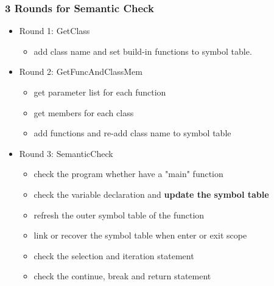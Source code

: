 \documentclass{beamer}
\begin{document}
\begin{frame} \frametitle{3 Rounds for Semantic Check}
	\begin{itemize}
		\item Round 1: GetClass
			\begin{itemize}
				\item add class name and set build-in functions to symbol table.	
			\end{itemize}
		\item Round 2: GetFuncAndClassMem
			\begin{itemize}
				\item get parameter list for each function
				\item get members for each class
				\item add functions and re-add class name to symbol table
			\end{itemize}
		\item Round 3: SemanticCheck
			\begin{itemize}
				\item check the program whether have a "main" function
				\item check the variable declaration and \textbf{update the symbol table}
				\item refresh the outer symbol table of the function
				\item link or recover the symbol table when enter or exit scope
				\item check the selection and iteration statement
				\item check the continue, break and return statement
			\end{itemize}
	\end{itemize}
\end{frame}
\end{document}
